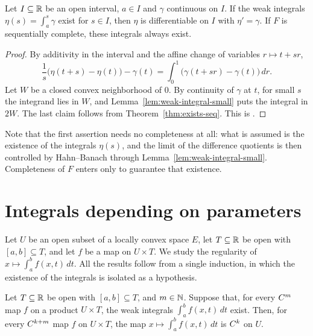 \begin{theorem}
  \label{thm:ftc2}
  \leanok
  Let $I \subseteq \mathbb{R}$ be an open interval, $a \in I$ and $\gamma$ continuous on $I$. If the weak
  integrals $\eta(s) = \int_a^s \gamma$ exist for $s \in I$, then $\eta$ is differentiable on
  $I$ with $\eta' = \gamma$. If $F$ is sequentially complete, these integrals always exist.
\end{theorem}

\begin{proof}
  \leanok
  By additivity in the interval and the affine change of variables $r \mapsto t + sr$,
  \[
    \frac{1}{s}\bigl(\eta(t + s) - \eta(t)\bigr) - \gamma(t)
      = \int_0^1 \bigl(\gamma(t + sr) - \gamma(t)\bigr)\, dr .
  \]
  Let $W$ be a closed convex neighborhood of $0$. By continuity of $\gamma$ at $t$, for small
  $s$ the integrand lies in $W$, and Lemma~\ref{lem:weak-integral-small} puts the integral in
  $2W$. The last claim follows from Theorem~\ref{thm:exists-seq}. This is \cite[1.1.12]{GN26}.
\end{proof}

\begin{remark}
  Note that the first assertion needs no completeness at all: what is assumed is the existence
  of the integrals $\eta(s)$, and the limit of the difference quotients is then controlled by
  Hahn--Banach through Lemma~\ref{lem:weak-integral-small}. Completeness of $F$ enters only to
  guarantee that existence.
\end{remark}

\section{Integrals depending on parameters}
\label{sec:param}

Let $U$ be an open subset of a locally convex space $E$, let $T \subseteq \mathbb{R}$ be open with
$[a, b] \subseteq T$, and let $f$ be a map on $U \times T$. We study the regularity of
$x \mapsto \int_a^b f(x, t)\, dt$. All the results follow from a single induction, in which the
existence of the integrals is isolated as a hypothesis.

\begin{theorem}
  \label{thm:param-induction}
  \leanok
  Let $T \subseteq \mathbb{R}$ be open with $[a, b] \subseteq T$, and $m \in \mathbb{N}$. Suppose that, for
  every $C^{m}$ map $f$ on a product $U \times T$, the weak integrals $\int_a^b f(x, t)\, dt$
  exist. Then, for every $C^{k + m}$ map $f$ on $U \times T$, the map
  $x \mapsto \int_a^b f(x, t)\, dt$ is $C^{k}$ on $U$.
\end{theorem}

